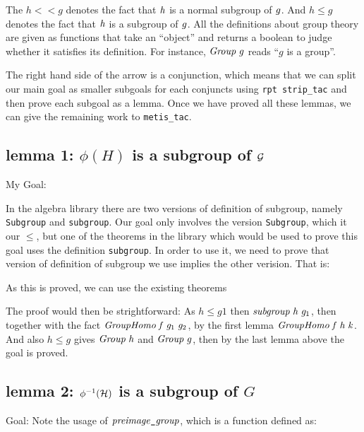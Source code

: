 \documentclass[letterpaper]{article}
\renewcommand{\HOLinline}[1]{\ensuremath{#1}}
\begin{document}
The $h < < g$ denotes the fact that \HOLinline{\HOLFreeVar{h}} is a normal subgroup of \HOLinline{\HOLFreeVar{g}}. And $h \le g$ denotes the fact that \HOLinline{\HOLFreeVar{h}} is a subgroup of \HOLinline{\HOLFreeVar{g}}. All the definitions about group theory are given as functions that take an ``object'' and returns a boolean to judge whether it satisfies its definition. For instance, \HOLinline{\HOLFreeVar{Group}\;\HOLFreeVar{g}} reads ``$g$ is a group''.

The right hand side of the arrow is a conjunction, which means that we can split our main goal as smaller subgoals for each conjuncts using \texttt{rpt strip_tac} and then prove each subgoal as a lemma. Once we have proved all these lemmas, we can give the remaining work to \texttt{metis_tac}.

\subsection{lemma 1: $\phi (H)$ is a subgroup of ${\cal G}$}

My Goal:

In the algebra library there are two versions of definition of subgroup, namely \texttt{Subgroup} and \texttt{subgroup}. Our goal only involves the version \texttt{Subgroup}, which it our $\leq$, but one of the theorems in the library which would be used to prove this goal uses the definition \texttt{subgroup}. In order to use it, we need to prove that version of definition of subgroup we use implies the other verision. That is:

As this is proved, we can use the existing theorems

The proof would then be strightforward: As $h \leq g1$ then \HOLinline{\HOLFreeVar{subgroup}\;\HOLFreeVar{h}\;\HOLFreeVar{g\sb{\mathrm{1}}}}, then together with the fact \HOLinline{\HOLFreeVar{GroupHomo}\;\HOLFreeVar{f}\;\HOLFreeVar{g\sb{\mathrm{1}}}\;\HOLFreeVar{g\sb{\mathrm{2}}}}, by the first lemma \HOLinline{\HOLFreeVar{GroupHomo}\;\HOLFreeVar{f}\;\HOLFreeVar{h}\;\HOLFreeVar{k}}. And also $h\leq g$ gives \HOLinline{\HOLFreeVar{Group}\;\HOLFreeVar{h}} and \HOLinline{\HOLFreeVar{Group}\;\HOLFreeVar{g}}, then by the last lemma above the goal is proved.

\subsection{lemma 2: $\phi^{-1}({\cal H})$ is a subgroup of $G$}

Goal:
Note the usage of \HOLinline{\HOLFreeVar{preimage\HOLTokenUnderscore{}group}}, which is a function defined as:
\end{document}
